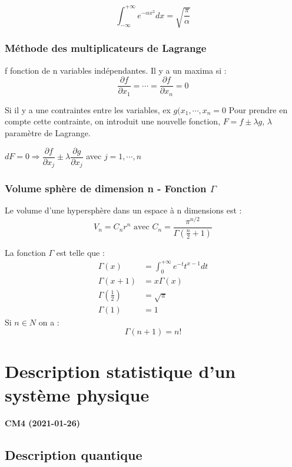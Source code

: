 \documentclass[12pt,a4paper]{report}
\begin{document}
\[
	\int_{-\infty}^{+\infty} e^{-\alpha x^2}dx = \sqrt{\dfrac{\pi}{\alpha}}
\]

\subsection{Méthode des multiplicateurs de Lagrange}

f fonction de n variables indépendantes. Il y a un maxima si :
\[
	\dfrac{\partial f}{\partial x_1} = \cdots = \dfrac{\partial f}{\partial x_n} = 0
\]

Si il y a une contraintes entre les variables, ex \(g(x_1, \cdots, x_n = 0\)
Pour prendre en compte cette contrainte, on introduit une nouvelle fonction, \(F = f \pm \lambda g\), \(\lambda\) paramètre de Lagrange.

\(dF = 0 \Rightarrow \dfrac{\partial f}{\partial x_j} \pm \lambda \dfrac{\partial g}{\partial x_j}\) avec \(j = 1, \cdots, n\)

\subsection{Volume sphère de dimension n - Fonction \(\Gamma\)}

Le volume d'une hypersphère dans un espace à n dimensions est :
\[
	V_n = C_n r^n \text{ avec } C_n = \dfrac{\pi^{n/2}}{\Gamma\left( \frac{n}{2} + 1 \right)}
\]

La fonction \(\Gamma\) est telle que :
\begin{align*}
	\Gamma(x) &= \int_0^{+\infty} e^{-t} t^{x - 1} dt\\
	\Gamma (x+1) &= x \Gamma(x)\\
	\Gamma (\frac{1}{2}) &= \sqrt{\pi}\\
	\Gamma (1) &= 1	
\end{align*}
Si \(n \in N\) on a :
\[
\Gamma (n + 1) = n!
\]	


\chapter{Description statistique d'un système physique}

\begin{center}
\textbf{CM4 (2021-01-26)}
\end{center}

\section{Description quantique}
\end{document}
